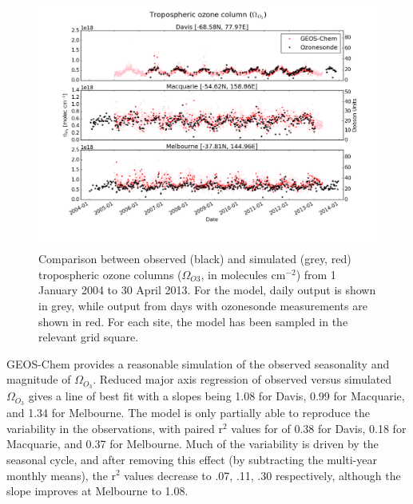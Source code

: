\documentclass{article}
\begin{document}
  \begin{figure}[!htbp]
    \includegraphics[width=\textwidth]{figures/StationSeries.png}
    \caption{Comparison between observed (black) and simulated (grey, red) tropospheric ozone columns ($\Omega_{O3}$, in molecules cm$^{-2}$) from 1 January 2004 to 30 April 2013.
    For the model, daily output is shown in grey, while output from days with ozonesonde measurements are shown in red.
    For each site, the model has been sampled in the relevant grid square.}
    \label{fig:StationSeriesGEOSChem}
  \end{figure}
  
  GEOS-Chem provides a reasonable simulation of the observed seasonality and magnitude of $\Omega_{O_3}$. 
  Reduced major axis regression of observed versus simulated $\Omega_{O_3}$ gives a line of best fit with a slopes being 1.08 for Davis, 0.99 for Macquarie, and 1.34 for Melbourne.
  The model is only partially able to reproduce the variability in the observations, with paired r$^2$ values for of 0.38 for Davis, 0.18 for Macquarie, and 0.37 for Melbourne.
  Much of the variability is driven by the seasonal cycle, and after removing this effect (by subtracting the multi-year monthly means), the r$^2$ values decrease to .07, .11, .30 respectively, although the slope improves at Melbourne to 1.08.
  
\end{document}
